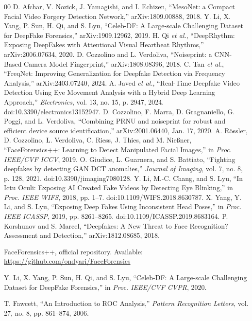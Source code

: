 \documentclass[conference]{IEEEtran}
\begin{document}
\begin{thebibliography}{00}
 D. Afchar, V. Nozick, J. Yamagishi, and I. Echizen, ``MesoNet: a Compact Facial Video Forgery Detection Network,'' arXiv:1809.00888, 2018.
 Y. Li, X. Yang, P. Sun, H. Qi, and S. Lyu, ``Celeb-DF: A Large-scale Challenging Dataset for DeepFake Forensics,'' arXiv:1909.12962, 2019.
 H. Qi \textit{et al.}, ``DeepRhythm: Exposing DeepFakes with Attentional Visual Heartbeat Rhythms,'' arXiv:2006.07634, 2020.
 D. Cozzolino and L. Verdoliva, ``Noiseprint: a CNN-Based Camera Model Fingerprint,'' arXiv:1808.08396, 2018.
 C. Tan \textit{et al.}, ``FreqNet: Improving Generalization for Deepfake Detection via Frequency Analysis,'' arXiv:2403.07240, 2024.
 A. Javed \textit{et al.}, ``Real-Time Deepfake Video Detection Using Eye Movement Analysis with a Hybrid Deep Learning Approach,'' \textit{Electronics}, vol. 13, no. 15, p. 2947, 2024. doi:10.3390/electronics13152947.
 D. Cozzolino, F. Marra, D. Gragnaniello, G. Poggi, and L. Verdoliva, ``Combining PRNU and noiseprint for robust and efficient device source identification,'' arXiv:2001.06440, Jan. 17, 2020.
 A. R\"ossler, D. Cozzolino, L. Verdoliva, C. Riess, J. Thies, and M. Nie{\ss}ner, ``FaceForensics++: Learning to Detect Manipulated Facial Images,'' in \textit{Proc. IEEE/CVF ICCV}, 2019.
 O. Giudice, L. Guarnera, and S. Battiato, ``Fighting deepfakes by detecting GAN DCT anomalies,'' \textit{Journal of Imaging}, vol. 7, no. 8, p. 128, 2021. doi:10.3390/jimaging7080128.
 Y. Li, M.-C. Chang, and S. Lyu, ``In Ictu Oculi: Exposing AI Created Fake Videos by Detecting Eye Blinking,'' in \textit{Proc. IEEE WIFS}, 2018, pp. 1--7. doi:10.1109/WIFS.2018.8630787.
 X. Yang, Y. Li, and S. Lyu, ``Exposing Deep Fakes Using Inconsistent Head Poses,'' in \textit{Proc. IEEE ICASSP}, 2019, pp. 8261--8265. doi:10.1109/ICASSP.2019.8683164.
 P. Korshunov and S. Marcel, ``Deepfakes: A New Threat to Face Recognition? Assessment and Detection,'' arXiv:1812.08685, 2018.

 FaceForensics++, official repository. Available: \url{https://github.com/ondyari/FaceForensics}

 Y. Li, X. Yang, P. Sun, H. Qi, and S. Lyu, ``Celeb-DF: A Large-scale Challenging Dataset for DeepFake Forensics,'' in \textit{Proc. IEEE/CVF CVPR}, 2020.

 T. Fawcett, ``An Introduction to ROC Analysis,'' \textit{Pattern Recognition Letters}, vol. 27, no. 8, pp. 861--874, 2006.


\end{thebibliography}
\end{document}
